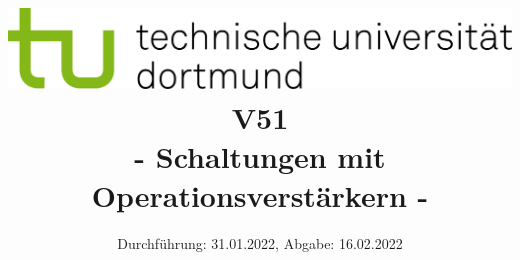 
\usepackage{romannum}
\usepackage{listings}
\lstset{numbers=left, numberstyle=\tiny, numbersep=5pt}
\lstset{language=Perl}

\title{\includegraphics[scale=0.8]{../logo.jpg} \\ \vspace*{1cm} V51 \\ - Schaltungen mit Operationsverstärkern -}

\date{Durchführung: 31.01.2022, Abgabe: 16.02.2022}



\maketitle
\thispagestyle{empty}
\tableofcontents
\newpage



%
%

\nocite{*}
\printbibliography{}
%
